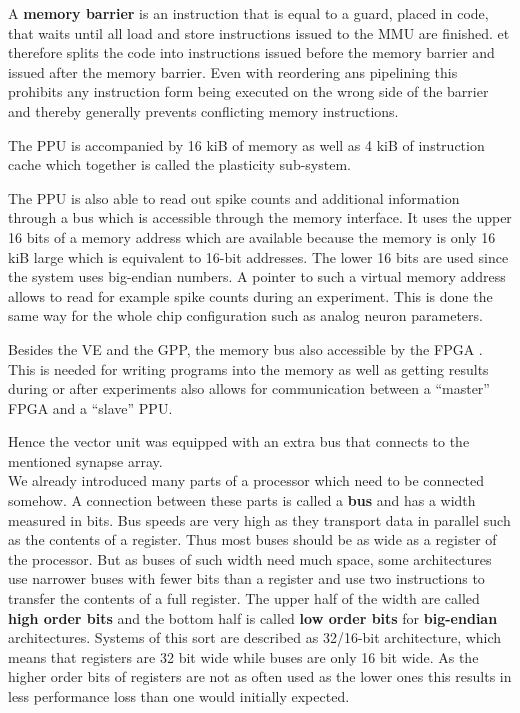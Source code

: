 A \textbf{memory barrier} is an instruction that is equal to a guard, placed in code, that waits until all load and store instructions issued to the MMU are finished.
et therefore splits the code into instructions issued before the memory barrier and issued after the memory barrier.
Even with reordering ans pipelining this prohibits any instruction form being executed on the wrong side of the barrier and thereby generally prevents conflicting memory instructions.

The PPU is accompanied by 16 kiB of memory as well as 4 kiB of instruction cache which together is called the plasticity sub-system.






The PPU is also able to read out spike counts and additional information through a bus which is accessible through the memory interface.
It uses the upper 16 bits of a memory address which are available because the memory is only 16 kiB large which is equivalent to 16-bit addresses.
The lower 16 bits are used since the system uses big-endian numbers.
A pointer to such a virtual memory address allows to read for example spike counts during an experiment.
This is done the same way for the whole chip configuration such as analog neuron parameters.

Besides the VE and the GPP, the memory bus also accessible by the FPGA .
This is needed for writing programs into the memory as well as getting results during or after experiments also allows for communication between a ``master'' FPGA and a ``slave'' PPU.

Hence the vector unit was equipped with an extra bus that connects to the mentioned synapse array.
\\
We already introduced many parts of a processor which need to be connected somehow.
A connection between these parts is called a \textbf{bus} and has a width measured in bits.
Bus speeds are very high as they transport data in parallel such as the contents of a register.
Thus most buses should be as wide as a register of the processor.
But as buses of such width need much space, some architectures use narrower buses with fewer bits than a register and use two instructions to transfer the contents of a full register.
The upper half of the width are called \textbf{high order bits} and the bottom half is called \textbf{low order bits} for \textbf{big-endian} architectures.
Systems of this sort are described as 32/16-bit architecture, which means that registers are 32 bit wide while buses are only 16 bit wide.
As the higher order bits of registers are not as often used as the lower ones this results in less performance loss than one would initially expected.


